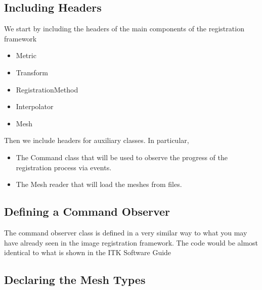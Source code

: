 \documentclass{InsightArticle}
\begin{document}
\subsection{Including Headers}

We start by including the headers of the main components of the registration framework

\begin{itemize}
\item Metric
\item Transform
\item RegistrationMethod
\item Interpolator
\item Mesh
\end{itemize}

\begin{center}

\end{center}

Then we include headers for auxiliary classes. In particular, 

\begin{itemize}
\item The Command class that will be used to observe the progress of the registration process via events.
\item The Mesh reader that will load the meshes from files.
\end{itemize}

\begin{center}

\end{center}

\subsection{Defining a Command Observer}

The command observer class is defined in a very similar way to what you may
have already seen in the image registration framework. The code would be almost
identical to what is shown in the ITK Software Guide \cite{ITKSoftwareGuideSecondEdition}

\begin{center}

\end{center}


\subsection{Declaring the Mesh Types}
\end{document}
